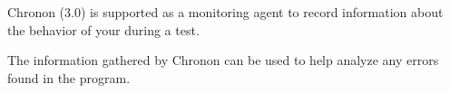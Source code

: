 Chronon (3.0) is supported as a monitoring agent to record information about the behavior of your \gdaut{} during a test. 

The information gathered by Chronon can be used to help analyze any errors found in the program. 

